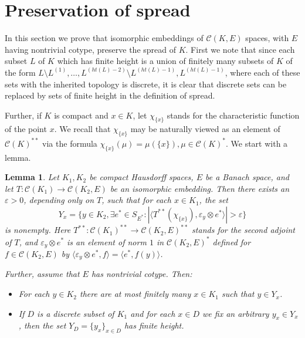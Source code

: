 \documentclass{amsart}
\numberwithin{equation}{section}
\newtheorem{lemma}[thm]{Lemma}
\theoremstyle{definition}
\def\C{\mathcal C}
\def\ep{\varepsilon}
\def\la{\langle}
\def\ra{\rangle}
\newcommand{\abs}[1]{\left| #1  \right|}
\begin{document}
\section{Preservation of spread}

 In this section we prove that isomorphic embeddings of $\C(K, E)$ spaces, with $E$ having nontrivial cotype, preserve the spread of $K$. First we note that since each subset $L$ of $K$ which has finite height is a union of finitely many subsets of $K$ of the form $L \setminus L^{(1)}, \ldots , L^{(ht(L)-2)} \setminus L^{(ht(L)-1)}, L^{(ht(L)-1)}$, where each of these sets with the inherited topology is discrete, it is clear that discrete sets can be replaced by sets of finite height in the definition of spread.  
 
 Further, if $K$ is compact and $x \in K$, let $\chi_{\{x\}}$ stands for the characteristic function of the point $x$. We recall that $\chi_{\{x\}}$ may be naturally viewed as an element of $\C(K)^{**}$ via the formula $\chi_{\{x\}}(\mu)=\mu(\{x\}), \mu \in \C(K)^*$. We start with a lemma.

\begin{lemma}
\label{discrete}
Let $K_1, K_2$ be compact Hausdorff spaces, $E$ be a Banach space, and let $T: \C(K_1) \rightarrow \C(K_2, E)$ be an isomorphic embedding. Then there exists an $\ep>0$, depending only on $T$, such that for each $x \in K_1$, the set 
\[Y_x=\{y \in K_2, \exists e^* \in S_{E^*}: \abs{\la T^{**}(\chi_{\{x\}}), \ep_y \otimes e^* \ra}>\ep \}\] 
is nonempty. Here $T^{**}:\C(K_1)^{**} \rightarrow \C(K_2, E)^{**}$ stands for the second adjoint of $T$, and $\ep_y \otimes e^*$ is an element of norm $1$ in $\C(K_2, E)^{*}$ defined for $f \in \C(K_2, E)$ by $\la \ep_y \otimes e^*, f \ra=\la e^*, f(y) \ra$.

Further, assume that $E$ has nontrivial cotype. Then:
\begin{itemize}
    \item[(i)] For each $y \in K_2$ there are at most finitely many $x \in K_1$ such that $y \in Y_x$.
    \item[(ii)] If $D$ is a discrete subset of $K_1$ and for each $x \in D$ we fix an arbitrary $y_x \in Y_x$, then the set $Y_D=\{y_x\}_{x \in D}$ has finite height.
\end{itemize}
\end{lemma}
\end{document}
